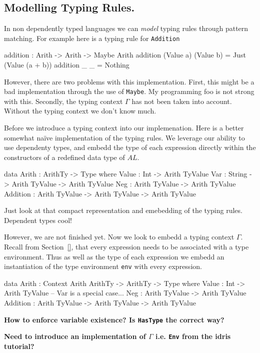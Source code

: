 \subsection{Modelling Typing Rules.}
\label{sec:rules:modelling}

In non dependently typed languages we can \emph{model} typing rules through pattern matching.
For example here is a typing rule for \texttt{Addition}
\begin{code}
addition : Arith -> Arith -> Maybe Arith
addition (Value a) (Value b) = Just (Value (a + b))
addition _         _         = Nothing
\end{code}

\noindent
However, there are two problems with this implementation.
First, this might be a bad implementation through the use of \texttt{Maybe}.
My programming foo is not strong with this.
Secondly, the typing context $\Gamma$ has not been taken into account.
Without the typing context we don't know much.

Before we introduce a typing context into our implemenation.
Here is a better somewhat na\"{i}ve implementation of the typing rules.
We leverage our ability to use dependenty types, and embedd the type of each expression directly within the constructors of a redefined data type of $AL$.

\begin{code}
data Arith : ArithTy -> Type where
  Value    : Int                            -> Arith TyValue
  Var      : String        -> Arith TyValue -> Arith TyValue
  Neg      : Arith TyValue                  -> Arith TyValue
  Addition : Arith TyValue -> Arith TyValue -> Arith TyValue
\end{code}

\noindent
Just look at that compact representation and emebedding of the typing rules.
Dependent types cool!

However, we are not finished yet.
Now we look to embedd a typing context $\Gamma$.
Recall from Section~\ref{}, that every expression needs to be associated with a type environment.
Thus as well as the type of each expression we embedd an instantiation of the type environment \texttt{env} with every expression.

\begin{code}
data Arith : Context Arith ArithTy -> ArithTy -> Type where
  Value  : Int -> Arith TyValue
  -- Var is a special case...
  Neg      : Arith TyValue -> Arith TyValue
  Addition : Arith TyValue -> Arith TyValue -> Arith TyValue
\end{code}

\begin{center}
  \bfseries How to enforce variable existence? Is \texttt{HasType} the correct way?
\end{center}
\begin{center}
  \bfseries Need to introduce an implementation of $\Gamma$ i.e. \texttt{Env} from the idris tutorial?
\end{center}
